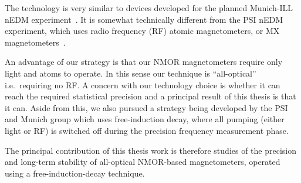 
The technology is very similar to devices developed for the planned
Munich-ILL nEDM experiment~\cite{mythesis}.  It is somewhat
technically different from the PSI nEDM experiment, which uses radio
frequency (RF) atomic magnetometers, or MX
magnetometers~\cite{Groeger2006}.

An advantage of our strategy is that our NMOR magnetometers require
only light and atoms to operate.  In this sense our technique is
``all-optical'' i.e.~requiring no RF.  A concern with our technology
choice is whether it can reach the required statistical precision and
a principal result of this thesis is that it can.  Aside from this, we
also pursued a strategy being developed by the PSI and Munich group
which uses free-induction decay, where all pumping (either light or
RF) is switched off during the precision frequency measurement phase.






The principal contribution of this thesis work is therefore studies of
the precision and long-term stability of all-optical NMOR-based
magnetometers, operated using a free-induction-decay technique.

